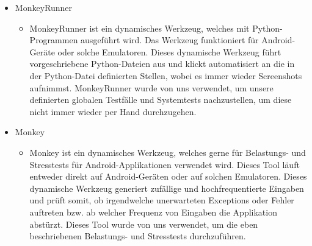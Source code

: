 \begin{itemize}
\item MonkeyRunner
\begin{itemize} 
\item MonkeyRunner ist ein dynamisches Werkzeug, welches mit Python-Programmen ausgeführt wird. Das Werkzeug funktioniert für Android-Geräte oder solche Emulatoren.
	Dieses dynamische Werkzeug führt vorgeschriebene Python-Dateien aus und klickt automatisiert an die in der Python-Datei definierten Stellen, wobei es immer wieder Screenshots aufnimmst.
	MonkeyRunner wurde von uns verwendet, um unsere definierten globalen Testfälle und Systemtests nachzustellen, um diese nicht immer wieder per Hand durchzugehen.
	\end{itemize}
\end{itemize}

\begin{itemize}
\item Monkey
\begin{itemize} 
\item Monkey ist ein dynamisches Werkzeug, welches gerne für Belastungs- und Stresstests für Android-Applikationen verwendet wird. Dieses Tool läuft entweder direkt auf Android-Geräten oder auf solchen Emulatoren.
	Dieses dynamische Werkzeug generiert zufällige und hochfrequentierte Eingaben und prüft somit, ob irgendwelche unerwarteten Exceptions oder Fehler auftreten bzw. ab welcher Frequenz von Eingaben die Applikation 	  abstürzt. Dieses Tool wurde von uns verwendet, um die eben beschriebenen Belastungs- und Stresstests durchzuführen.
	\end{itemize}
\end{itemize}